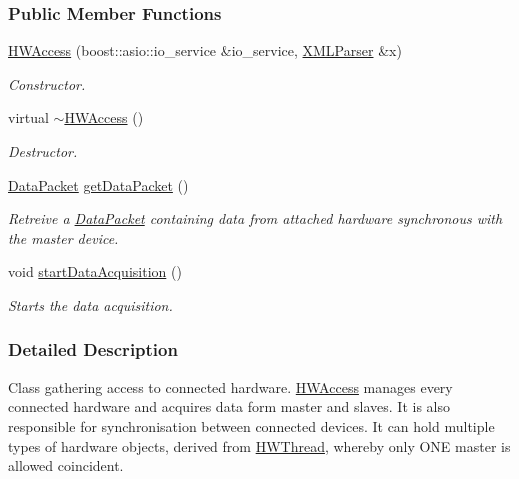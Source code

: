 \subsubsection*{Public Member Functions}
\begin{DoxyCompactItemize}
\item 
\hyperlink{class_h_w_access_a13743506121dae31b4b8622ed8996897}{HWAccess} (boost::asio::io\_\-service \&io\_\-service, \hyperlink{class_x_m_l_parser}{XMLParser} \&x)
\begin{DoxyCompactList}\small\item\em Constructor. \item\end{DoxyCompactList}\item 
virtual \hyperlink{class_h_w_access_ad72009e954effa86c26a9b21cc8c6b9f}{$\sim$HWAccess} ()
\begin{DoxyCompactList}\small\item\em Destructor. \item\end{DoxyCompactList}\item 
\hyperlink{class_data_packet}{DataPacket} \hyperlink{class_h_w_access_a99d0f4c10e9def70d1189fc6c2100a20}{getDataPacket} ()
\begin{DoxyCompactList}\small\item\em Retreive a \hyperlink{class_data_packet}{DataPacket} containing data from attached hardware synchronous with the master device. \item\end{DoxyCompactList}\item 
\hypertarget{class_h_w_access_aaea1315bea475e68615271242b963cfd}{
void \hyperlink{class_h_w_access_aaea1315bea475e68615271242b963cfd}{startDataAcquisition} ()}
\label{class_h_w_access_aaea1315bea475e68615271242b963cfd}

\begin{DoxyCompactList}\small\item\em Starts the data acquisition. \item\end{DoxyCompactList}\end{DoxyCompactItemize}


\subsubsection{Detailed Description}
Class gathering access to connected hardware. \hyperlink{class_h_w_access}{HWAccess} manages every connected hardware and acquires data form master and slaves. It is also responsible for synchronisation between connected devices. It can hold multiple types of hardware objects, derived from \hyperlink{class_h_w_thread}{HWThread}, whereby only ONE master is allowed coincident. 

